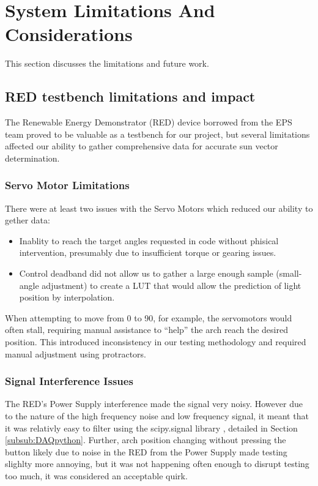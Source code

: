 \section{System Limitations And Considerations}
This section discusses the limitations and future work.
\subsection{\acf{RED} testbench limitations and impact}
The Renewable Energy Demonstrator (RED) device borrowed from the EPS team \cite{RefWorks:shopov2022renewable} proved to be valuable as a testbench for our project, but several limitations affected our ability to gather comprehensive data for accurate sun vector determination.
\subsubsection{Servo Motor Limitations}
There were at least two issues with the Servo Motors which reduced our ability to gether data:
\begin{itemize}
    \item Inablity to reach the target angles requested in code without phisical intervention, presumably due to insufficient torque or gearing issues.
    \item Control deadband did not allow us to gather a large enough sample (small-angle adjustment) to create a \ac{LUT} that would allow the prediction of light position by interpolation.
\end{itemize}

When attempting to move from 0\textdegree{} to 90\textdegree{}, for example, the servomotors would often stall, requiring manual assistance to ``help'' the arch reach the desired position. This introduced inconsistency in our testing methodology and required manual adjustment using protractors.

\subsubsection{Signal Interference Issues}

The \ac{RED}'s Power Supply interference made the signal very noisy. However due to the nature of the high frequency noise and low frequency signal, it meant that it was relativly easy to filter using the scipy.signal library \cite{RefWorks:butter}, detailed in Section \ref{subsub:DAQpython}. Further, arch position changing without pressing the button likely due to noise in the \ac{RED} from the Power Supply made testing slighlty more annoying, but it was not happening often enough to disrupt testing too much, it was considered an acceptable quirk.

